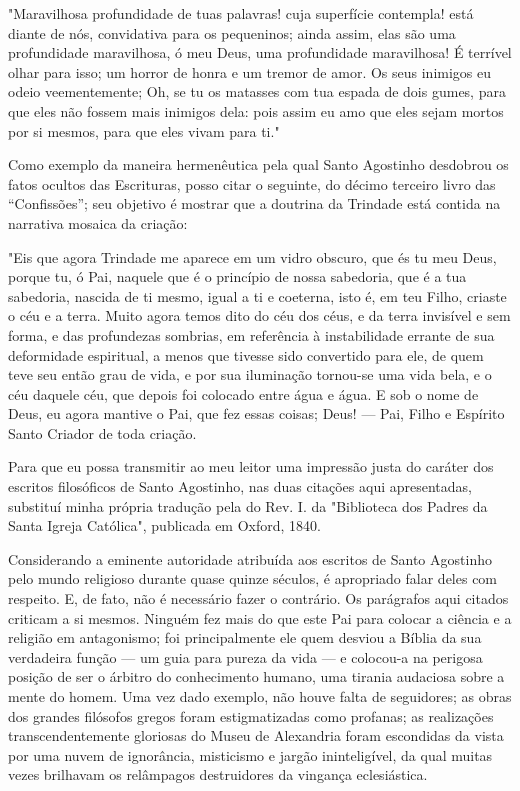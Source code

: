 \documentclass[11pt,a5paper,twoside,openany]{book}
\begin{document}
"Maravilhosa profundidade de tuas palavras! cuja superfície contempla! está diante de nós, convidativa para os pequeninos; ainda assim, elas são uma profundidade maravilhosa, ó meu Deus, uma profundidade maravilhosa! É terrível olhar para isso; um horror de honra e um tremor de amor. Os seus inimigos eu odeio veementemente; Oh, se tu os matasses com tua espada de dois gumes, para que eles não fossem mais inimigos dela: pois assim eu amo que eles sejam mortos por si mesmos, para que eles vivam para ti."

Como exemplo da maneira hermenêutica pela qual Santo Agostinho desdobrou os fatos ocultos das Escrituras, posso citar o seguinte, do décimo terceiro livro das “Confissões”; seu objetivo é mostrar que a doutrina da Trindade está contida na narrativa mosaica da criação:

"Eis que agora Trindade me aparece em um vidro obscuro, que és tu meu Deus, porque tu, ó Pai, naquele que é o princípio de nossa sabedoria, que é a tua sabedoria, nascida de ti mesmo, igual a ti e coeterna, isto é, em teu Filho, criaste o céu e a terra. Muito agora temos dito do céu dos céus, e da terra invisível e sem forma, e das profundezas sombrias, em referência à instabilidade errante de sua deformidade espiritual, a menos que tivesse sido convertido para ele, de quem teve seu então grau de vida, e por sua iluminação tornou-se uma vida bela, e o céu daquele céu, que depois foi colocado entre água e água. E sob o nome de Deus, eu agora mantive o Pai, que fez essas coisas; Deus! — Pai, Filho e Espírito Santo Criador de toda criação.

Para que eu possa transmitir ao meu leitor uma impressão justa do caráter dos escritos filosóficos de Santo Agostinho, nas duas citações aqui apresentadas, substituí minha própria tradução pela do Rev. I. da "Biblioteca dos Padres da Santa Igreja Católica", publicada em Oxford, 1840.

Considerando a eminente autoridade atribuída aos escritos de Santo Agostinho pelo mundo religioso durante quase quinze séculos, é apropriado falar deles com respeito. E, de fato, não é necessário fazer o contrário. Os parágrafos aqui citados criticam a si mesmos. Ninguém fez mais do que este Pai para colocar a ciência e a religião em antagonismo; foi principalmente ele quem desviou a Bíblia da sua verdadeira função — um guia para pureza da vida — e colocou-a na perigosa posição de ser o árbitro do conhecimento humano, uma tirania audaciosa sobre a mente do homem. Uma vez dado exemplo, não houve falta de seguidores; as obras dos grandes filósofos gregos foram estigmatizadas como profanas; as realizações transcendentemente gloriosas do Museu de Alexandria foram escondidas da vista por uma nuvem de ignorância, misticismo e jargão ininteligível, da qual muitas vezes brilhavam os relâmpagos destruidores da vingança eclesiástica.
\end{document}
